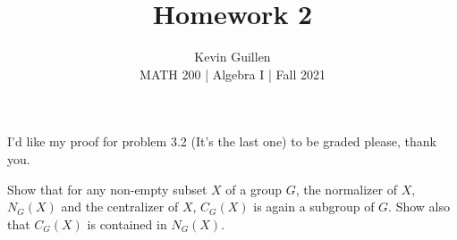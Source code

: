 \documentclass[10pt]{article}
\newenvironment{problem}[2][Problem\!]{\begin{trivlist}
\item[\hskip \labelsep {\bfseries #1}\hskip \labelsep {\bfseries #2.}]}{\end{trivlist}}
\begin{document}
 
\title{Homework 2}
\author{Kevin Guillen\\[0.5cm]
MATH 200 | Algebra I | Fall 2021}
\date{} 
\maketitle

I'd like my proof for problem 3.2 (It's the last one) to be graded please, thank you. 

\begin{tcolorbox}
    \begin{problem}{2.6}
        Show that for any non-empty subset $X$ of a group $G$, the normalizer of $X$, $N_G(X)$ and the centralizer of $X$, $C_G(X)$ is again a subgroup of $G$. Show also that $C_G(X)$ is contained in $N_G(X)$.
    \end{problem}
\end{tcolorbox}
\end{document}
